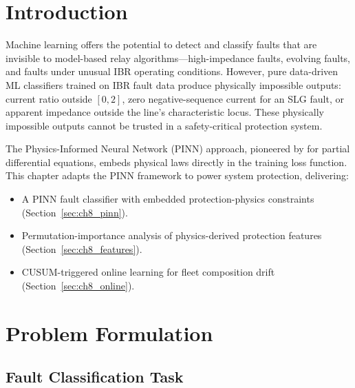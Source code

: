 
\section{Introduction}
\label{sec:ch8_intro}

Machine learning offers the potential to detect and classify faults
that are invisible to model-based relay algorithms—high-impedance faults,
evolving faults, and faults under unusual IBR operating conditions.
However, pure data-driven ML classifiers trained on IBR fault data
produce physically impossible outputs: current ratio outside $[0, 2]$,
zero negative-sequence current for an SLG fault, or apparent impedance
outside the line's characteristic locus. These physically impossible
outputs cannot be trusted in a safety-critical protection system.

The Physics-Informed Neural Network (PINN) approach, pioneered by
\citet{Raissi2019} for partial differential equations, embeds physical
laws directly in the training loss function. This chapter adapts the
PINN framework to power system protection, delivering:
\begin{itemize}
\item A PINN fault classifier with embedded protection-physics
      constraints (Section~\ref{sec:ch8_pinn}).
\item Permutation-importance analysis of physics-derived
      protection features (Section~\ref{sec:ch8_features}).
\item CUSUM-triggered online learning for fleet composition
      drift (Section~\ref{sec:ch8_online}).
\end{itemize}

\section{Problem Formulation}
\label{sec:ch8_problem}

\subsection{Fault Classification Task}

